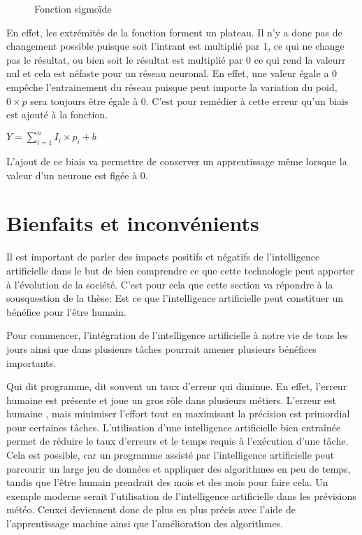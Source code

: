 \documentclass[letterpaper,10pt,french]{sphinxmanual}
\begin{document}
\begin{figure}[htbp]
\centering
\capstart

\noindent{}
\caption{Fonction sigmoïde}\label{\detokenize{training:tanh}}\end{figure}

En effet, les extrémités de la fonction forment un plateau. Il n’y a donc pas de changement
possible puisque soit l’intrant est multiplié par 1, ce qui ne change pas le résultat, ou bien
soit le résultat est multiplié par 0 ce qui rend la valeurr nul et cela est néfaste pour un réseau neuronal.
En effet, une valeur égale a 0 empêche l’entrainement du réseau puisque peut importe la variation
du poid, \(0\times p\) sera toujours être égale à 0. C’est pour remédier à cette erreur qu’un biais est ajouté
à la fonction.

\(Y =\sum_{i=1}^{n} I_i \times p_i + b\)

L’ajout de ce biais va permettre de conserver un apprentissage même lorsque la valeur d’un neurone est figée à 0.


\section{Bienfaits et inconvénients}
\label{\detokenize{bienfaits_et_inconv_xe9nients:bienfaits-et-inconvenients}}\label{\detokenize{bienfaits_et_inconv_xe9nients::doc}}
Il est important de parler des impacts positifs et négatifs de l’intelligence
artificielle dans le but de bien comprendre ce que cette technologie peut apporter
à l’évolution de la société. C’est pour cela que cette section va répondre à la
sous\sphinxhyphen{}question de la thèse: Est\sphinxhyphen{} ce que l’intelligence artificielle peut constituer
un bénéfice pour l’être humain.

Pour commencer, l’intégration de l’intelligence artificielle à notre vie de tous
les jours ainsi que dans plusieurs tâches pourrait amener plusieurs bénéfices
importants.

Qui dit programme, dit souvent un taux d’erreur qui diminue. En effet, l’erreur
humaine est présente et joue un gros rôle dans plusieurs métiers. L’erreur est humaine
, mais minimiser l’effort tout en maximisant la précision est primordial pour
certaines tâches. L’utilisation d’une intelligence artificielle bien entraînée
permet de réduire le taux d’erreurs et le temps requis à l’exécution d’une tâche.
Cela est possible, car un programme assisté par l’intelligence artificielle peut
parcourir un large jeu de données et appliquer des algorithmes en peu de temps,
tandis que l’être humain prendrait des mois et des mois pour faire cela. Un exemple
moderne serait l’utilisation de l’intelligence artificielle dans les prévisions météo.
Ceux\sphinxhyphen{}ci deviennent donc de plus en plus précis avec l’aide de l’apprentissage
machine ainsi que l’amélioration des algorithmes.
\end{document}

